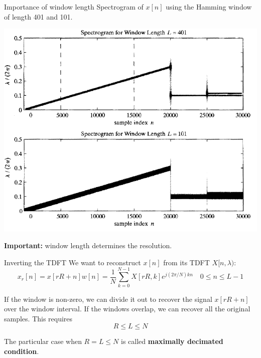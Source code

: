 \documentclass[10pt]{beamer}
\begin{document}
\begin{frame}{Importance of window length}
Spectrogram of $x[n]$ using the Hamming window of length 401 and 101.
\begin{center}
	\includegraphics[scale=0.7]{figs/spectrogram_window_length.png}
\end{center}

\textbf{Important:} window length determines the resolution.

\end{frame}

\begin{frame}{Inverting the TDFT}
We want to reconstruct $x[n]$ from its TDFT $X[n, \lambda)$:
\begin{equation*}
	x_r[n] = x[rR+n]w[n] = \frac{1}{N}\sum_{k = 0}^{N-1}X[rR, k]e^{j(2\pi/N)kn} \quad 0 \leq n \leq L-1
\end{equation*}

If the window is non-zero, we can divide it out to recover the signal $x[rR+n]$ over the window interval. If the windows overlap, we can recover all the original samples. This requires
\begin{equation*}
	R \leq L \leq N
\end{equation*}

The particular case when $R = L \leq N$ is called \textbf{maximally decimated condition}.

\end{frame}
\end{document}
